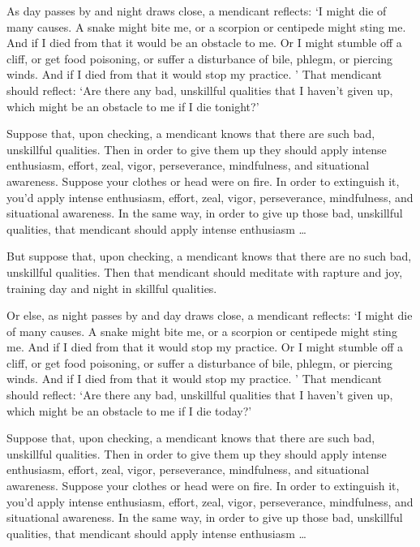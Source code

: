 \documentclass[12pt,openany]{book}%
\begin{document}
As day passes by and night draws close, a mendicant reflects: ‘I might die of many causes. A snake might bite me, or a scorpion or centipede might sting me. And if I died from that it would be an obstacle to me. Or I might stumble off a cliff, or get food poisoning, or suffer a disturbance of bile, phlegm, or piercing winds. And if I died from that it would stop my practice. ’ That mendicant should reflect: ‘Are there any bad, unskillful qualities that I haven’t given up, which might be an obstacle to me if I die tonight?’ 

Suppose that, upon checking, a mendicant knows that there are such bad, unskillful qualities. Then in order to give them up they should apply intense enthusiasm, effort, zeal, vigor, perseverance, mindfulness, and situational awareness. Suppose your clothes or head were on fire. In order to extinguish it, you’d apply intense enthusiasm, effort, zeal, vigor, perseverance, mindfulness, and situational awareness. In the same way, in order to give up those bad, unskillful qualities, that mendicant should apply intense enthusiasm … 

But suppose that, upon checking, a mendicant knows that there are no such bad, unskillful qualities. Then that mendicant should meditate with rapture and joy, training day and night in skillful qualities. 

Or else, as night passes by and day draws close, a mendicant reflects: ‘I might die of many causes. A snake might bite me, or a scorpion or centipede might sting me. And if I died from that it would stop my practice. Or I might stumble off a cliff, or get food poisoning, or suffer a disturbance of bile, phlegm, or piercing winds. And if I died from that it would stop my practice. ’ That mendicant should reflect: ‘Are there any bad, unskillful qualities that I haven’t given up, which might be an obstacle to me if I die today?’ 

Suppose that, upon checking, a mendicant knows that there are such bad, unskillful qualities. Then in order to give them up they should apply intense enthusiasm, effort, zeal, vigor, perseverance, mindfulness, and situational awareness. Suppose your clothes or head were on fire. In order to extinguish it, you’d apply intense enthusiasm, effort, zeal, vigor, perseverance, mindfulness, and situational awareness. In the same way, in order to give up those bad, unskillful qualities, that mendicant should apply intense enthusiasm … 
\end{document}
